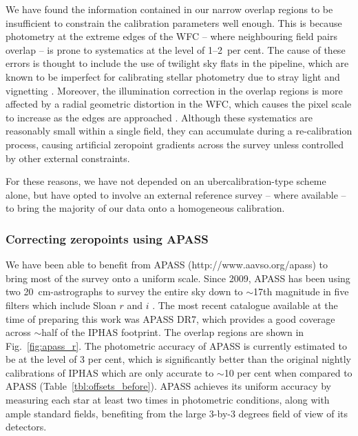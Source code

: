 \documentclass[a4paper,useAMS,usenatbib]{mn2e}
\begin{document}
We have found the information contained
in our narrow overlap regions to be insufficient
to constrain the calibration parameters well enough.
This is because photometry at the extreme edges of the WFC
-- where neighbouring field pairs overlap -- 
is prone to systematics at the level of 1--2~per cent.
The cause of these errors is thought to include 
the use of twilight sky flats in the pipeline,
which are known to be imperfect for calibrating stellar photometry 
due to stray light and vignetting \citep[e.g.][]{Manfroid1995}.
Moreover, the illumination correction in the overlap regions
is more affected by a radial geometric distortion in the WFC,
which causes the pixel scale to increase as the edges 
are approached \citep{Gonzalez-Solares2011}.
Although these systematics are reasonably small within a single field,
they can accumulate during a re-calibration process,
causing artificial zeropoint gradients across the survey
unless controlled by other external constraints.

For these reasons, we have not depended
on an ubercalibration-type scheme alone,
but have opted to involve an external reference survey
-- where available --
to bring the majority of our data onto a homogeneous calibration.

\subsubsection{Correcting zeropoints using APASS}

We have been able to benefit from APASS
(http://www.aavso.org/apass)
to bring most of the survey 
onto a uniform scale.
Since 2009,
APASS has been using two 20~cm-astrographs
to survey the entire sky down to $\sim$17th magnitude
in five filters which include Sloan $r$ and $i$ \citep{Henden2012}.
The most recent catalogue available 
at the time of preparing this work was APASS DR7,
which provides a good coverage across $\sim$half
of the IPHAS footprint.
The overlap regions are shown in Fig.~\ref{fig:apass_r}.
The photometric accuracy of APASS is currently estimated 
to be at the level of 3 per cent,
which is significantly better 
than the original nightly calibrations of IPHAS
which are only accurate to $\sim$10 per cent
when compared to APASS (Table~\ref{tbl:offsets_before}).
APASS achieves its uniform accuracy 
by measuring each star at least two times in photometric conditions,
along with ample standard fields,
benefiting from the large 3-by-3 degrees field of view of its detectors.
\end{document}
